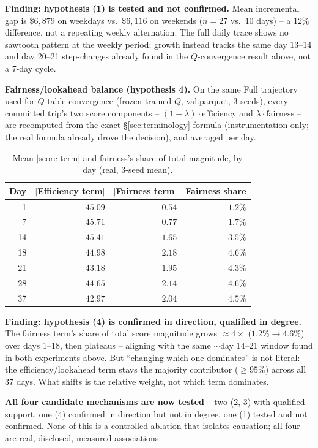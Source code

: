 \documentclass[10pt,twocolumn,a4paper]{article}
\begin{document}
\textbf{Finding: hypothesis (1) is tested and not confirmed.} Mean
incremental gap is $\$6{,}879$ on weekdays vs.\ $\$6{,}116$ on weekends ($n=27$
vs.\ $10$ days) -- a $12\%$ difference, not a repeating weekly
alternation. The full daily trace shows no sawtooth pattern at the
weekly period; growth instead tracks the same day 13--14 and day 20--21
step-changes already found in the $Q$-convergence result above, not a
7-day cycle.

\textbf{Fairness/lookahead balance (hypothesis 4).} On the same Full
trajectory used for $Q$-table convergence (frozen trained $Q$, val.parquet,
3 seeds), every committed trip's two score components --
$(1-\lambda)\cdot\text{efficiency}$ and $\lambda\cdot\text{fairness}$ --
are recomputed from the exact \S\ref{sec:terminology} formula (instrumentation
only; the real formula already drove the decision), and averaged per day.

\begin{table}[h!]
\centering
\caption{Mean $|$score term$|$ and fairness's share of total magnitude, by day (real, 3-seed mean).}
\label{tab:fairbalance}
\footnotesize
\begin{tabular}{@{}rrrr@{}}
\toprule
Day & $|$Efficiency term$|$ & $|$Fairness term$|$ & Fairness share \\
\midrule
1  & $45.09$ & $0.54$ & $1.2\%$ \\
7  & $45.71$ & $0.77$ & $1.7\%$ \\
14 & $45.41$ & $1.65$ & $3.5\%$ \\
18 & $44.98$ & $2.18$ & $4.6\%$ \\
21 & $43.18$ & $1.95$ & $4.3\%$ \\
28 & $44.65$ & $2.14$ & $4.6\%$ \\
37 & $42.97$ & $2.04$ & $4.5\%$ \\
\bottomrule
\end{tabular}
\end{table}

\textbf{Finding: hypothesis (4) is confirmed in direction, qualified in
degree.} The fairness term's share of total score magnitude grows
$\approx4\times$ ($1.2\%\to4.6\%$) over days 1--18, then plateaus --
aligning with the same $\sim$day 14--21 window found in both experiments
above. But ``changing which one dominates'' is not literal: the
efficiency/lookahead term stays the majority contributor
($\geq\!95\%$) across all 37 days. What shifts is the relative weight, not
which term dominates.

\textbf{All four candidate mechanisms are now tested} -- two (2, 3) with
qualified support, one (4) confirmed in direction but not in degree, one
(1) tested and not confirmed. None of this is a controlled ablation that
isolates causation; all four are real, disclosed, measured associations.
\end{document}
